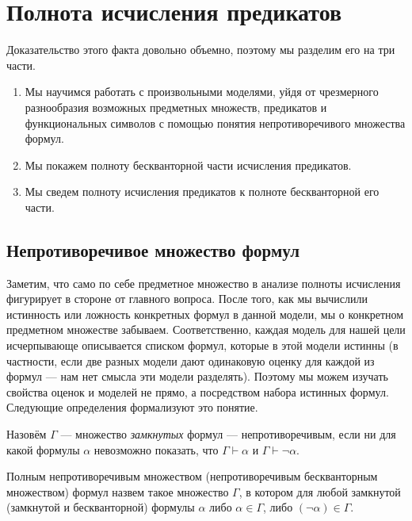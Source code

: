 \section{Полнота исчисления предикатов}

Доказательство этого факта довольно объемно, поэтому мы разделим
его на три части. 
\begin{enumerate}
\item Мы научимся работать с произвольными
моделями, уйдя от чрезмерного разнообразия возможных предметных
множеств, предикатов и функциональных символов с помощью понятия
непротиворечивого множества формул.

\item Мы покажем полноту бескванторной части исчисления предикатов.

\item Мы сведем полноту исчисления предикатов к полноте
бескванторной его части.
\end{enumerate}

\subsection{Непротиворечивое множество формул}

Заметим, что само по себе предметное множество в анализе полноты
исчисления фигурирует в стороне от главного вопроса. После того, 
как мы вычислили истинность или ложность конкретных формул в данной 
модели, мы о конкретном предметном множестве забываем. Соответственно, 
каждая модель для нашей цели исчерпывающе описывается списком формул,
которые в этой модели истинны
(в частности, если две разных модели
дают одинаковую оценку для каждой из формул --- нам нет смысла эти
модели разделять). 
Поэтому мы можем изучать свойства оценок и моделей не
прямо, а посредством набора истинных формул.
Следующие определения формализуют это понятие.

\begin{definition}
Назовём $\Gamma$ --- множество \emph{замкнутых} формул --- непротиворечивым, 
если ни для какой
формулы $\alpha$ невозможно показать, что $\Gamma \vdash \alpha$ и
$\Gamma \vdash \neg \alpha$.
\end{definition}

\begin{definition}
Полным непротиворечивым множеством (непротиворечивым бескванторным множеством)
формул назвем такое множество $\Gamma$,
в котором для любой замкнутой (замкнутой и бескванторной) формулы 
$\alpha$ либо $\alpha \in \Gamma$, либо
$(\neg \alpha) \in \Gamma$.
\end{definition}

